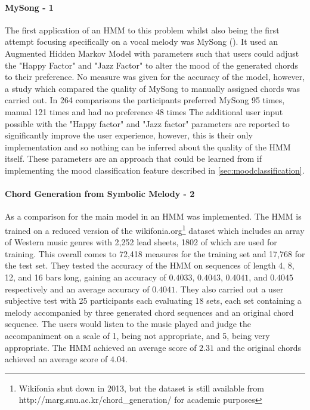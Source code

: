 \paragraph{MySong - 1} The first application of an HMM to this problem whilst also being the first attempt focusing specifically on a vocal melody was MySong (\cite{MySong}).
It used an Augmented Hidden Markov Model with parameters such that users could adjust the "Happy Factor" and "Jazz Factor" to alter the mood of the generated chords to their preference.
No measure was given for the accuracy of the model, however, a study which compared the quality of MySong to manually assigned chords was carried out. 
In 264 comparisons the participants preferred MySong 95 times, manual 121 times and had no preference 48 times
The additional user input possible with the "Happy factor" and "Jazz factor" parameters are reported to significantly improve the user experience, however, this is their only implementation and so nothing can be inferred about the quality of the HMM itself.
These parameters are an approach that could be learned from if implementing the mood classification feature described in \cref{sec:moodclassification}.

\paragraph{Chord Generation from Symbolic Melody - 2}  As a comparison for the main model in \cite{BLSTM} an HMM was implemented. 
The HMM is trained on a reduced version of the 
wikifonia.org\footnote{Wikifonia shut down in 2013, but the dataset is still available from http://marg.snu.ac.kr/chord\_generation/ for academic purposes} dataset which includes an array of Western music genres with 2,252 lead sheets, 1802 of which are used for training. 
This overall comes to 72,418 measures for the training set and 17,768 for the test set. 
They tested the accuracy of the HMM on sequences of length 4, 8, 12, and 16 bars long, gaining an accuracy of $0.4033$, $0.4043$, $0.4041$, and $0.4045$ respectively and an average accuracy of $0.4041$.
They also carried out a user subjective test with 25 participants each evaluating 18 sets, each set containing a melody accompanied by three generated chord sequences and an original chord sequence.
The users would listen to the music played and judge the accompaniment on a scale of 1, being not appropriate, and 5, being very appropriate.
The HMM achieved an average score of $2.31$ and the original chords achieved an average score of $4.04$.

